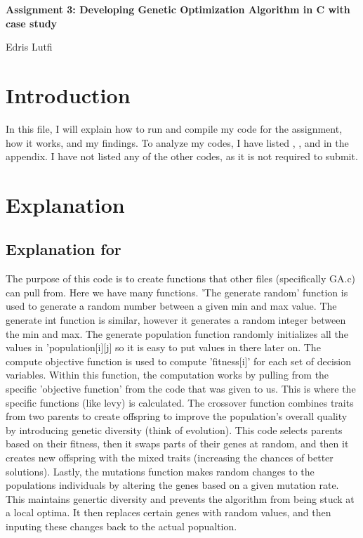 \documentclass[12pt]{article}
\begin{document}
	
	\justifying
	
	\begin{center}
		
		\textbf{Assignment 3: Developing Genetic Optimization Algorithm in C with case study} 
		
		Edris Lutfi
	\end{center}
	

	
	
	
	\section{Introduction}
In this file, I will explain how to run and compile my code for the assignment, how it works, and my findings. To analyze my codes, I have listed , , and  in the appendix. I have not listed any of the other codes, as it is not required to submit.
	
	

	
	
	\section{Explanation}

	\subsection{Explanation for }
 The purpose of this code is to create functions that other files (specifically GA.c) can pull from. Here we have many functions. 'The generate random' function is used to generate a random number between a given min and max value. The generate int function is similar, however it generates a random integer between the min and max. The generate population function randomly initializes all the values in 'population[i][j] so it is easy to put values in there later on. The compute objective function is used to compute 'fitness[i]' for each set of decision variables. Within this function, the computation works by pulling from the specific 'objective function' from the  code that was given to us. This is where the specific functions (like levy) is calculated. The crossover function combines traits from two parents to create offspring to improve the population's overall quality by introducing genetic diversity (think of evolution). This code selects parents based on their fitness, then it swaps parts of their genes at random, and then it creates new offspring with the mixed traits (increasing the chances of better solutions). Lastly, the mutations function makes random changes to the populations individuals by altering the genes based on a given mutation rate. This maintains genertic diversity and prevents the algorithm from being stuck at a local optima. It then replaces certain genes with random values, and then inputing these changes back to the actual popualtion.
\end{document}
